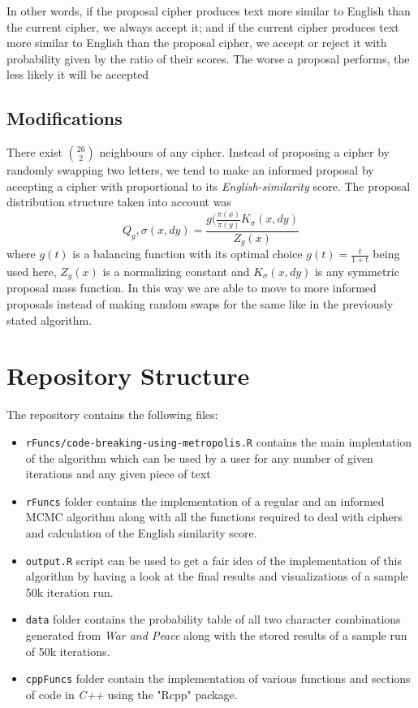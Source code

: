 \documentclass{article}
\begin{document}
In other words, if the proposal cipher produces text more similar to English than the current cipher, we always accept it; and if the current cipher produces text more similar to English than the proposal cipher, we accept or reject it with probability given by the ratio of their scores. The worse a proposal performs, the less likely it will be accepted

\subsection{Modifications}
There exist $26 \choose 2$ neighbours of any cipher. Instead of proposing a cipher by randomly swapping two letters, we tend to make an informed proposal by accepting a cipher with proportional to its \emph{English-similarity} score. The proposal distribution structure taken into account was $$Q_g,\sigma(x,dy) = \frac{g(\frac{\pi(x)}{\pi(y)}K_\sigma(x,dy)}{Z_g(x)}$$
where $g(t)$ is a balancing function with its optimal choice $g(t) = \frac{t}{1+t}$ being used here, $Z_g(x)$ is a normalizing constant and $K_\sigma(x,dy)$ is any symmetric proposal mass function. In this way we are able to move to more informed proposals instead of making random swaps for the same like in the previously stated algorithm. 

\section{Repository Structure}

The repository contains the following files:

\begin{itemize}
    \item \texttt{rFuncs/code-breaking-using-metropolis.R} contains the main implentation of the algorithm which can be used by a user for any number of given iterations and any given piece of text
    \item \texttt{rFuncs} folder contains the implementation of a regular and an informed MCMC algorithm along with all the functions required to deal with ciphers and calculation of the English similarity score.
    \item \texttt{output.R} script can be used to get a fair idea of the implementation of this algorithm by having a look at the final results and visualizations of a sample 50k iteration run.
    \item \texttt{data} folder contains the probability table of all two character combinations generated from \emph{War and Peace} along with the stored results of a sample run of 50k iterations.
    \item \texttt{cppFuncs} folder contain the implementation of various functions and sections of code in \emph{C++} using the "Rcpp" package.
\end{itemize}
\end{document}
